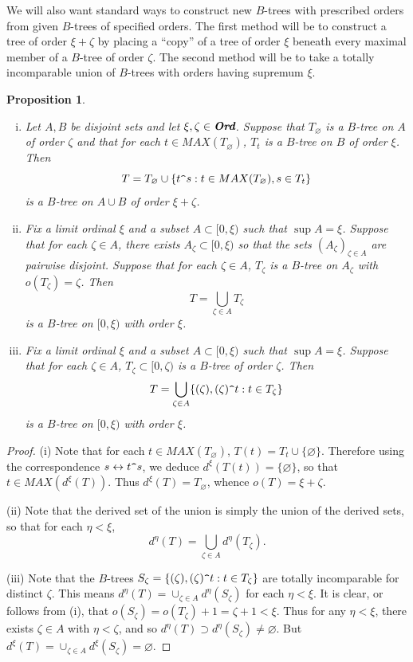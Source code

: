 \documentclass[12pt]{amsart}
\newtheorem{proposition}[theorem]{Proposition}
\theoremstyle{definition}
\newcommand{\ord}{\textbf{Ord}}
\begin{document}
We will also want standard ways to construct new $B$-trees with prescribed orders from given $B$-trees of specified orders.  The first method will be to construct a tree of order $\xi+\zeta$ by placing a ``copy'' of a tree of order $\xi$ beneath every maximal member of a $B$-tree of order $\zeta$.  The second method will be to take a totally incomparable union of $B$-trees with orders having supremum $\xi$.  



\begin{proposition} \begin{enumerate}[(i)]\item Let $A, B$ be disjoint sets and let $\xi, \zeta\in \emph{\ord}$.  Suppose that $T_\varnothing$ is a $B$-tree on $A$ of order $\zeta$ and that for each $t\in MAX(T_\varnothing)$, $T_t$ is a $B$-tree on $B$ of order $\xi$.  Then $$T=T_\varnothing \cup \{t\verb!^!s: t\in MAX(T_\varnothing), s\in T_t\}$$ is a $B$-tree on $A\cup B$ of order $\xi+\zeta$. 

\item Fix a limit ordinal $\xi$ and a subset $A\subset [0, \xi)$ such that $\sup A=\xi$.  Suppose that for each $\zeta\in A$, there exists $A_\zeta\subset [0,\xi)$ so that the sets $(A_\zeta)_{\zeta\in A}$ are pairwise disjoint.  Suppose that for each $\zeta\in A$, $T_\zeta$ is a $B$-tree on $A_\zeta$ with $o(T_\zeta)=\zeta$.  Then $$T=\bigcup_{\zeta\in A}T_\zeta$$ is a $B$-tree on $[0,\xi)$ with order $\xi$.  

\item Fix a limit ordinal $\xi$ and a subset $A\subset [0, \xi)$ such that $\sup A=\xi$. Suppose that for each $\zeta\in A$, $T_\zeta\subset [0, \zeta)$ is a $B$-tree of order $\zeta$. Then $$T=\bigcup_{\zeta\in A}\{(\zeta), (\zeta)\verb!^!t: t\in T_\zeta\}$$ is a $B$-tree on $[ 0, \xi)$ with order $\xi$. \end{enumerate}


\label{new from old}
\end{proposition}

\begin{proof}(i) Note that for each $t\in MAX(T_\varnothing)$, $T(t)=T_t\cup \{\varnothing\}$.  Therefore using the correspondence $s\leftrightarrow t\verb!^!s$, we deduce $d^\xi(T(t))=\{\varnothing\}$, so that $t\in MAX(d^\xi(T))$.  Thus $d^\xi(T)=T_\varnothing$, whence $o(T)=\xi+\zeta$.  

(ii) Note that the derived set of the union is simply the union of the derived sets, so that for each $\eta<\xi$, $$d^\eta(T)=\bigcup_{\zeta\in A} d^\eta(T_\zeta).$$  


(iii) Note that the $B$-trees $S_\zeta=\{(\zeta), (\zeta)\verb!^!t: t\in T_\zeta\}$ are totally incomparable for distinct $\zeta$.  This means $d^\eta(T)=\cup_{\zeta\in A}d^\eta(S_\zeta)$ for each $\eta<\xi$.  It is clear, or follows from (i), that $o(S_\zeta)=o(T_\zeta)+1=\zeta+1<\xi$.  Thus for any $\eta<\xi$, there exists $\zeta\in A$ with $\eta<\zeta$, and so $d^\eta(T)\supset d^\eta(S_\zeta)\neq \varnothing$.  But $d^\xi(T)=\cup_{\zeta\in A} d^\xi(S_\zeta)=\varnothing$.  


\end{proof}
\end{document}

